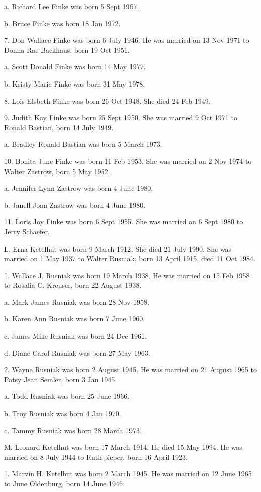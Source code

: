 \documentclass[a4paper]{article}
\begin{document}
a. Richard Lee Finke was born 5 Sept 1967.

b. Bruce Finke was born 18 Jan 1972.

7. Don Wallace Finke was born 6 July 1946.  He was married on 13 Nov 1971 to Donna Rae Backhaus, born 19 Oct 1951.

a. Scott Donald Finke was born 14 May 1977.

b. Kristy Marie Finke was born 31 May 1978.

8. Lois Elsbeth Finke was born 26 Oct 1948.  She died 24 Feb 1949.

9. Judith Kay Finke was born 25 Sept 1950.  She was married 9 Oct 1971 to Ronald Bastian, born 14 July 1949.

a. Bradley Ronald Bastian was born 5 March 1973.

10.  Bonita June Finke was born 11 Feb 1953.  She was married on 2 Nov 1974 to Walter Zastrow, born 5 May 1952.

a. Jennifer Lynn Zastrow was born 4 June 1980.

b. Janell Joan Zastrow was born 4 June 1980.

11. Loris Joy Finke was born 6 Sept 1955.  She was married on 6 Sept 1980 to Jerry Schaefer.

L. Erna Ketelhut was born 9 March 1912.  She died 21 July 1990.  She was married on 1 May 1937 to Walter Rusniak, born 13 April 1915, died 11 Oct 1984.

1. Wallace J. Rusniak was born 19 March 1938.  He was married on 15 Feb 1958 to Rosalia C. Kreuser, born 22 August 1938.

a. Mark James Rusniak was born 28 Nov 1958.

b. Karen Ann Rusniak was born 7 June 1960.

c. James Mike Rusniak was born 24 Dec 1961.

d. Diane Carol Rusniak was born 27 May 1963.

2. Wayne Rusniak was born 2 August 1945.  He was married on 21 August 1965 to Patsy Jean Semler, born 3 Jan 1945.

a. Todd Rusniak was born 25 June 1966.  

b. Troy Rusniak was born 4 Jan 1970.

c. Tammy Rusniak was born 28 March 1973.

M. Leonard Ketelhut was born 17 March 1914.  He died 15 May 1994.  He was married on 8 July 1944 to Ruth pieper, born 16 April 1923.  

1. Marvin H. Ketelhut was born 2 March 1945.  He was married on 12 June 1965 to June Oldenburg, born 14 June 1946.  
\end{document}
